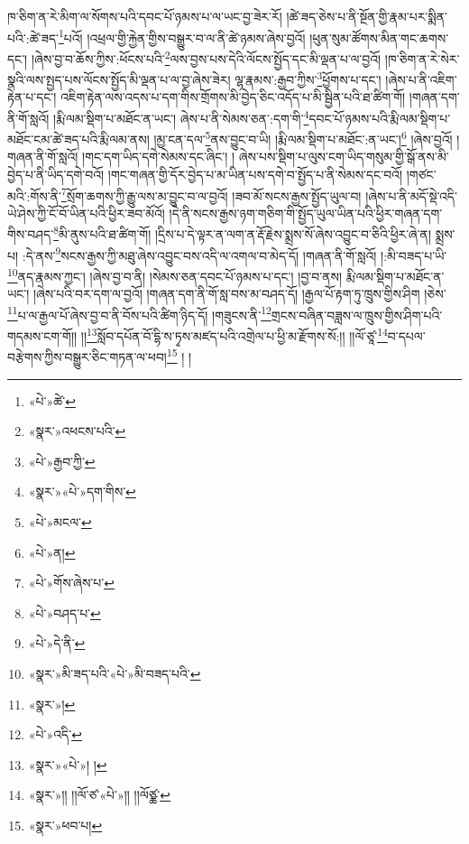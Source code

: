 ཁ་ཅིག་ན་རེ་མིག་ལ་སོགས་པའི་དབང་པོ་ཉམས་པ་ལ་ཡང་བྱ་ཟེར་རོ། །ཚེ་ཟད་ཅེས་པ་ནི་སྔོན་གྱི་རྣམ་པར་སྨིན་པའི་:ཚེ་ཟད་\footnote{«པེ་»ཚེ་}པའོ། །འཕྲལ་གྱི་རྐྱེན་གྱིས་བསྒྱུར་བ་ལ་ནི་ཚེ་ཉམས་ཞེས་བྱའོ། །ཕུན་སུམ་ཚོགས་མིན་གང་ཆགས་དང་། །ཞེས་བྱ་བ་ཆོས་ཀྱིས་:ཕོངས་པའི་\footnote{«སྣར་»འཕངས་པའི་}ལས་བྱས་པས་དེའི་ལོངས་སྤྱོད་དང་མི་ལྡན་པ་ལ་བྱའོ། །ཁ་ཅིག་ན་རེ་སེར་སྣའི་ལས་སྤྱད་པས་ལོངས་སྤྱོད་མི་ལྡན་པ་ལ་བྱ་ཞེས་ཟེར། ལྷ་རྣམས་:རྒྱབ་ཀྱིས་\footnote{«པེ་»རྒྱབ་ཀྱི་}ཕྱོགས་པ་དང་། །ཞེས་པ་ནི་འཇིག་རྟེན་པ་དང་། འཇིག་རྟེན་ལས་འདས་པ་དག་གིས་གྲོགས་མི་བྱེད་ཅིང་འདོད་པ་མི་སྦྱིན་པའི་ཐ་ཚིག་གོ། །གཞན་དག་ནི་གོ་སླའོ། །རྨི་ལམ་སྡིག་པ་མཐོང་ན་ཡང་། ཞེས་པ་ནི་སེམས་ཅན་:དག་གི་\footnote{«སྣར་»«པེ་»དག་གིས་}དབང་པོ་ཉམས་པའི་རྨི་ལམ་སྡིག་པ་མཐོང་ངམ་ཚེ་ཟད་པའི་རྨི་ལམ་ནས། །མྱ་ངན་དལ་\footnote{«པེ་»མངལ་}ནས་བྱུང་བ་ཡི། །རྨི་ལམ་སྡིག་པ་མཐོང་:ན་ཡང་།\footnote{«པེ་»ན།} །ཞེས་བྱའོ། །གཞན་ནི་གོ་སླའོ། །གང་དག་ཡིད་དགེ་སེམས་དང་ཞིང་། །
ཞེས་པས་སྡིག་པ་ལུས་ངག་ཡིད་གསུམ་གྱི་སྒོ་ནས་མི་བྱེད་པ་ནི་ཡིད་དགེ་བའོ། །གང་གཞན་གྱི་དོར་བྱེད་པ་མ་ཡིན་པས་དགེ་བ་སྤྱོད་པ་ནི་སེམས་དང་བའོ། །གཙང་མའི་:གོས་ནི་\footnote{«པེ་»གོས་ཞེས་པ་}སྲོག་ཆགས་ཀྱི་རྒྱུ་ལས་མ་བྱུང་བ་ལ་བྱའོ། །ཟབ་མོ་སངས་རྒྱས་སྤྱོད་ཡུལ་བ། །ཞེས་པ་ནི་མདོ་སྡེ་འདི་ཡེ་ཤེས་ཀྱི་ངོ་བོ་ཡིན་པའི་ཕྱིར་ཟབ་མོའོ། །དེ་ནི་སངས་རྒྱས་ཉག་གཅིག་གི་སྤྱོད་ཡུལ་ཡིན་པའི་ཕྱིར་གཞན་དག་གིས་བཤད་\footnote{«པེ་»བཤད་པ་}མི་ནུས་པའི་ཐ་ཚིག་གོ། །དྲིས་པ་དེ་ལྟར་ན་ལག་ན་རྡོ་རྗེས་སྨྲས་སོ་ཞེས་འབྱུང་བ་ཅིའི་ཕྱིར་ཞེ་ན། སྨྲས་པ། :དེ་ནས་\footnote{«པེ་»དེ་ནི་}སངས་རྒྱས་ཀྱི་མཐུ་ཞེས་འབྱུང་བས་འདི་ལ་འགལ་བ་མེད་དོ། །གཞན་ནི་གོ་སླའོ། །:མི་བཟད་པ་ཡི་\footnote{«སྣར་»མི་ཟད་པའི་«པེ་»མི་བཟད་པའི་}ནད་རྣམས་ཀྱང་། །ཞེས་བྱ་བ་ནི། །སེམས་ཅན་དབང་པོ་ཉམས་པ་དང་། །བྱ་བ་ནས། རྨི་ལམ་སྡིག་པ་མཐོང་ན་ཡང་། །ཞེས་པའི་བར་དག་ལ་བྱའོ། །གཞན་དག་ནི་གོ་སླ་བས་མ་བཤད་དོ། །རྒྱལ་པོ་རྟག་ཏུ་ཁྲུས་གྱིས་ཤིག །ཅེས་\footnote{«སྣར་»།}པ་ལ་རྒྱལ་པོ་ཞེས་བྱ་བ་ནི་བོས་པའི་ཚིག་ཉིད་དོ། །གཟུངས་ནི་\footnote{«པེ་»འདི་}གྲངས་བཞིན་བཟླས་ལ་ཁྲུས་གྱིས་ཤིག་པའི་གདམས་ངག་གོ།། །།\footnote{«སྣར་»«པེ་»། །}སློབ་དཔོན་བོ་དྷི་ས་ཏྭས་མཛད་པའི་འགྲེལ་པ་ཕྱི་མ་རྫོགས་སོ:།། །།ལོ་ཙཱ་\footnote{«སྣར་»།། །།ལོ་ཙ་«པེ་»།། །།ལོཙྪ་}བ་དཔལ་བརྩེགས་ཀྱིས་བསྒྱུར་ཅིང་གཏན་ལ་ཕབ།\footnote{«སྣར་»ཕབ་པ།} ། །